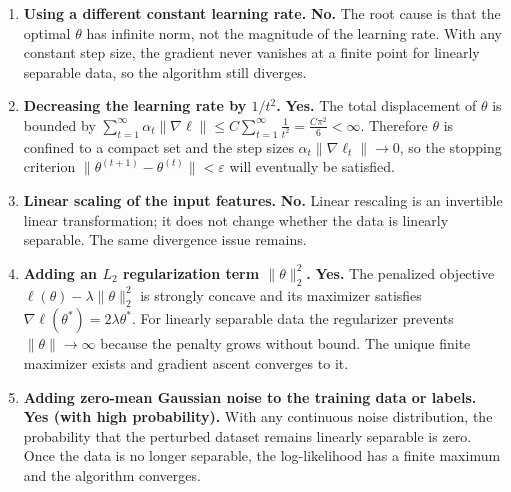 \begin{answer}
\begin{enumerate}[label=\roman*.]

\item \textbf{Using a different constant learning rate.} \textbf{No.} The root cause is that the optimal $\theta$ has infinite norm, not the magnitude of the learning rate. With any constant step size, the gradient never vanishes at a finite point for linearly separable data, so the algorithm still diverges.

\item \textbf{Decreasing the learning rate by $1/t^2$.} \textbf{Yes.} The total displacement of $\theta$ is bounded by $\sum_{t=1}^{\infty} \alpha_t \|\nabla\ell\| \leq C \sum_{t=1}^{\infty} \frac{1}{t^2} = \frac{C\pi^2}{6} < \infty$. Therefore $\theta$ is confined to a compact set and the step sizes $\alpha_t \|\nabla\ell_t\| \to 0$, so the stopping criterion $\|\theta^{(t+1)} - \theta^{(t)}\| < \varepsilon$ will eventually be satisfied.

\item \textbf{Linear scaling of the input features.} \textbf{No.} Linear rescaling is an invertible linear transformation; it does not change whether the data is linearly separable. The same divergence issue remains.

\item \textbf{Adding an $L_2$ regularization term $\|\theta\|_2^2$.} \textbf{Yes.} The penalized objective $\ell(\theta) - \lambda\|\theta\|_2^2$ is strongly concave and its maximizer satisfies $\nabla\ell(\theta^*) = 2\lambda\theta^*$. For linearly separable data the regularizer prevents $\|\theta\|\to\infty$ because the penalty grows without bound. The unique finite maximizer exists and gradient ascent converges to it.

\item \textbf{Adding zero-mean Gaussian noise to the training data or labels.} \textbf{Yes (with high probability).} With any continuous noise distribution, the probability that the perturbed dataset remains linearly separable is zero. Once the data is no longer separable, the log-likelihood has a finite maximum and the algorithm converges.

\end{enumerate}
\end{answer}
